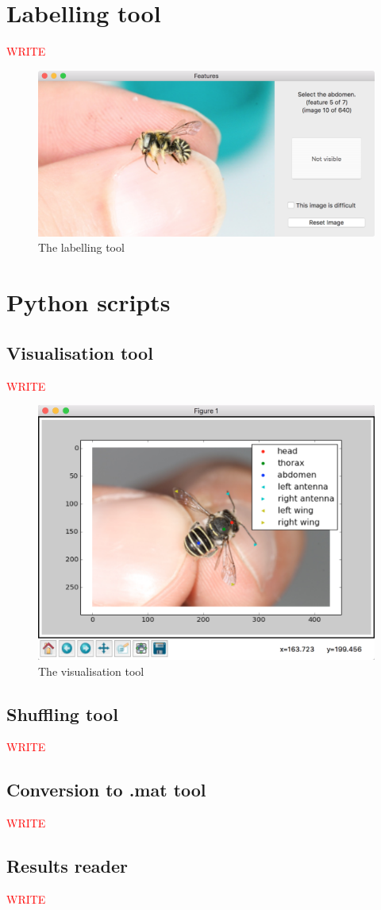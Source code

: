 \documentclass[11pt, oneside]{report}
\newcommand{\comment}[1]{\textcolor{red}{#1}}
\begin{document}
\chapter{Labelling tool}
    \comment{WRITE}
    \begin{figure}[h]
        \centering
        \includegraphics[width=\textwidth]{features_tool.png}\hfill
        \caption{The labelling tool}
        \label{fig:Labelling_screenshot}
    \end{figure}

\chapter{Python scripts}
    \section{Visualisation tool}
        \comment{WRITE}
        \begin{figure}[h]
            \centering
            \includegraphics[width=\textwidth]{visualisation_tool.png}\hfill
            \caption{The visualisation tool}
            \label{fig:Visualisation_screenshot}
        \end{figure}

    \section{Shuffling tool}
        \comment{WRITE}
    
    \section{Conversion to .mat tool}
        \comment{WRITE}
    
    \section{Results reader}
        \comment{WRITE}
\end{document}
